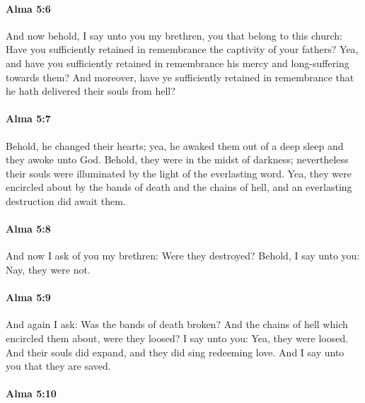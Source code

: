 		\paragraph{Alma 5:6} %
			\label{ALMA-5-6}

			And now behold, I say unto you my brethren,
			you that belong to this church:
			Have you sufficiently retained in remembrance the captivity of your fathers?
			Yea, and have you sufficiently retained in remembrance
			his mercy and long-suffering towards them?
			And moreover, have ye sufficiently retained in remembrance
			that he hath delivered their souls from hell?

		\paragraph{Alma 5:7} %
			\label{ALMA-5-7}

			Behold, he changed their hearts;
			yea, he awaked them out of a deep sleep
			and they awoke unto God.
			Behold, they were in the midst of darkness;
			nevertheless their souls were illuminated by the light of the everlasting word.
			Yea, they were encircled about by the bands of death and the chains of hell,
			and an everlasting destruction did await them.

		\paragraph{Alma 5:8} %
			\label{ALMA-5-8}

			And now I ask of you my brethren:
			Were they destroyed?
			Behold, I say unto you:
			Nay, they were not.

		\paragraph{Alma 5:9} %
			\label{ALMA-5-9}

			And again I ask:
			Was the bands of death broken?
			And the chains of hell which encircled them about, were they loosed?
			I say unto you:
			Yea, they were loosed.
			And their souls did expand,
			and they did sing redeeming love.
			And I say unto you that they are saved.

		\paragraph{Alma 5:10} %
			\label{ALMA-5-10}

